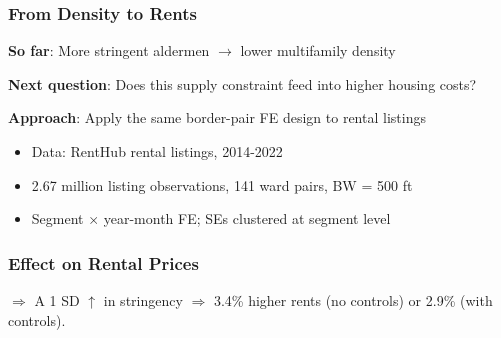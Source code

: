 
\begin{frame}
    \frametitle{From Density to Rents}

    \textbf{So far}: More stringent aldermen $\rightarrow$ lower multifamily density

    \vspace{0.5em}
    \textbf{Next question}: Does this supply constraint feed into higher housing costs?

    \vspace{0.5em}
    \textbf{Approach}: Apply the same border-pair FE design to rental listings
    \begin{itemize}
        \item Data: RentHub rental listings, 2014-2022
        \item 2.67 million listing observations, 141 ward pairs, BW = 500 ft
        \item Segment $\times$ year-month FE; SEs clustered at segment level
    \end{itemize}
\end{frame}


\begin{frame}[label=rental-fe-main]
    \frametitle{Effect on Rental Prices}

    \begin{center}
    \scriptsize
    
    \end{center}

    \vspace{0.3em}
    \small
    $\Rightarrow$ A 1 SD $\uparrow$ in stringency $\Rightarrow$ 3.4\% higher rents (no controls) or 2.9\% (with controls).

    \vfill\hfill \hyperlink{rental-permutation-noctrl}{}
\end{frame}


